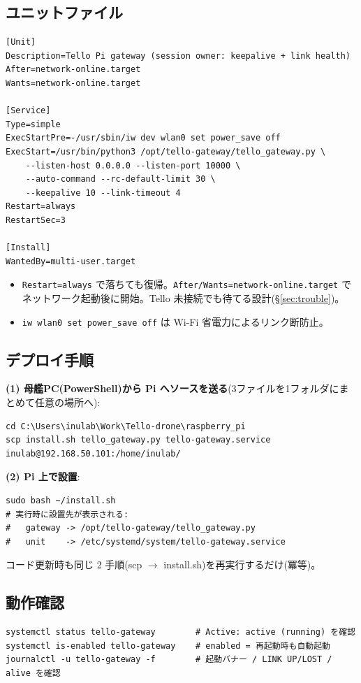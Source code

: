 \documentclass[11pt,a4paper]{ltjsarticle}
\newcommand{\code}[1]{\texttt{\small #1}}
\begin{document}
\subsection{ユニットファイル}
\begin{lstlisting}
[Unit]
Description=Tello Pi gateway (session owner: keepalive + link health)
After=network-online.target
Wants=network-online.target

[Service]
Type=simple
ExecStartPre=-/usr/sbin/iw dev wlan0 set power_save off
ExecStart=/usr/bin/python3 /opt/tello-gateway/tello_gateway.py \
    --listen-host 0.0.0.0 --listen-port 10000 \
    --auto-command --rc-default-limit 30 \
    --keepalive 10 --link-timeout 4
Restart=always
RestartSec=3

[Install]
WantedBy=multi-user.target
\end{lstlisting}

\begin{itemize}[leftmargin=1.4em]
  \item \code{Restart=always} で落ちても復帰。\code{After/Wants=network-online.target} で
        ネットワーク起動後に開始。Tello 未接続でも待てる設計(§\ref{sec:trouble})。
  \item \code{iw wlan0 set power\_save off} は Wi-Fi 省電力によるリンク断防止。
\end{itemize}

\subsection{デプロイ手順}
\textbf{(1) 母艦PC(PowerShell)から Pi へソースを送る}(3ファイルを1フォルダにまとめて任意の場所へ):
\begin{lstlisting}
cd C:\Users\inulab\Work\Tello-drone\raspberry_pi
scp install.sh tello_gateway.py tello-gateway.service inulab@192.168.50.101:/home/inulab/
\end{lstlisting}

\textbf{(2) Pi 上で設置}:
\begin{lstlisting}
sudo bash ~/install.sh
# 実行時に設置先が表示される:
#   gateway -> /opt/tello-gateway/tello_gateway.py
#   unit    -> /etc/systemd/system/tello-gateway.service
\end{lstlisting}
コード更新時も同じ 2 手順(scp $\to$ install.sh)を再実行するだけ(冪等)。

\subsection{動作確認}
\begin{lstlisting}
systemctl status tello-gateway        # Active: active (running) を確認
systemctl is-enabled tello-gateway    # enabled = 再起動時も自動起動
journalctl -u tello-gateway -f        # 起動バナー / LINK UP/LOST / alive を確認
\end{lstlisting}
\end{document}
